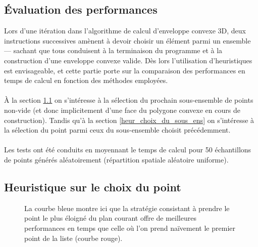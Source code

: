 \documentclass[]{article}
\begin{document}
\begin{multicols}{2}
\section{Évaluation des performances}
	Lors d'une itération dans l'algorithme de calcul d'enveloppe convexe 3D, deux instructions successives amènent à devoir choisir un élément parmi un ensemble — sachant que tous conduisent à la terminaison du programme et à la construction d'une enveloppe convexe valide. Dès lors l'utilisation d'heuristiques est envisageable, et cette partie porte sur la comparaison des performances en temps de calcul en fonction des méthodes employées.\\\\
	À la section \ref{heur_choix_du_point} on s'intéresse à la sélection du prochain sous-ensemble de points non-vide (et donc implicitement d'une face du polygone convexe en cours de construction).
	Tandis qu'à la section \ref{heur_choix_du_sous_ens} on s'intéresse à la sélection du point parmi ceux du sous-ensemble choisit précédemment.\\\\
	Les tests ont été conduits en moyennant le temps de calcul pour 50 échantillons de points générés aléatoirement (répartition spatiale aléatoire uniforme).
	
	\subsection{Heuristique sur le choix du point}\label{heur_choix_du_point}
	\begin{figure}[H]
		\caption{La courbe bleue montre ici que la stratégie consistant à prendre le point le plus éloigné du plan courant offre de meilleures performances en temps que celle où l'on prend naïvement le premier point de la liste (courbe rouge).}
	\end{figure}


\end{multicols}
\end{document}
